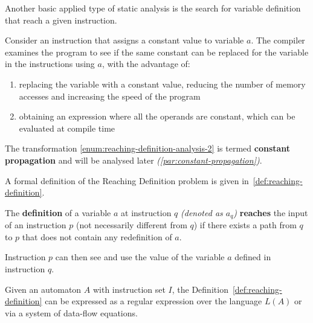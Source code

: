 \documentclass[english]{article}
\begin{document}
Another basic applied type of static analysis is the search for variable definition that reach a given instruction.

Consider an instruction that assigns a constant value to variable \(a\).
The compiler examines the program to see if the same constant can be replaced for the variable in the instructions using \(a\), with the advantage of:

\begin{enumerate}[label=\arabic*., ref=\arabic*.]
  \item\label{enum:reaching-definition-analysis-1} replacing the variable with a constant value, reducing the number of memory accesses and increasing the speed of the program
  \item\label{enum:reaching-definition-analysis-2} obtaining an expression where all the operands are constant, which can be evaluated at compile time
\end{enumerate}

The transformation \ref{enum:reaching-definition-analysis-2} is termed \textbf{constant propagation} and will be analysed later \textit{(\ref{par:constant-propagation})}.

A formal definition of the Reaching Definition problem is given in~\ref{def:reaching-definition}.

\begin{definition}
  \label{def:reaching-definition}
  The \textbf{definition} of a variable \(a\) at instruction \(q\) \textit{(denoted as \(a_q\))} \textbf{reaches} the input of an instruction \(p\) (not necessarily different from \(q\)) if there exists a path from \(q\) to \(p\) that does not contain any redefinition of \(a\).
\end{definition}

Instruction \(p\) can then see and use the value of the variable \(a\) defined in instruction \(q\).

Given an automaton \(A\) with instruction set \(I\), the Definition~\ref{def:reaching-definition} can be expressed as a regular expression over the language \(L(A)\) or via a system of data-flow equations.
\end{document}
